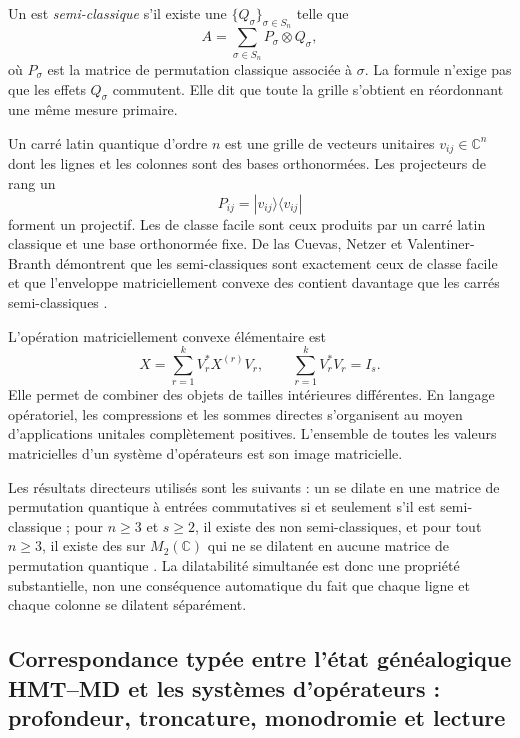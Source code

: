 Un \QMS est \emph{semi-classique} s'il existe une \POVM
\(\{Q_\sigma\}_{\sigma\in S_n}\) telle que
\[
 A=\sum_{\sigma\in S_n}P_\sigma\otimes Q_\sigma,
 \tag{GMC-1.2}
\]
où $P_\sigma$ est la matrice de permutation classique associée à
$\sigma$. La formule n'exige pas que les effets $Q_\sigma$ commutent. Elle dit
que toute la grille s'obtient en réordonnant une même mesure primaire.

Un carré latin quantique d'ordre $n$ est une grille de vecteurs
unitaires $v_{ij}\in\mathbb C^n$ dont les lignes et les colonnes sont des bases
orthonormées. Les projecteurs de rang un
\[
 P_{ij}=|v_{ij}\rangle\langle v_{ij}|
\]
forment un \QMS projectif. Les \QLS de classe facile sont ceux produits par un carré
latin classique et une base orthonormée fixe. De las Cuevas, Netzer et
Valentiner-Branth démontrent que les \QLS semi-classiques sont exactement ceux de
classe facile et que l'enveloppe matriciellement convexe des \QLS contient davantage que les
carrés semi-classiques \citep{delascuevas2023latin}.

L'opération matriciellement convexe élémentaire est
\[
 X=\sum_{r=1}^{k}V_r^*X^{(r)}V_r,
 \qquad
 \sum_{r=1}^{k}V_r^*V_r=I_s.
 \tag{GMC-1.3}
\]
Elle permet de combiner des objets de tailles intérieures différentes. En langage
opératoriel, les compressions et les sommes directes s'organisent au moyen
d'applications unitales complètement positives. L'ensemble de toutes les
valeurs matricielles d'un système d'opérateurs est son image matricielle.

\begin{importbox}
Les résultats directeurs utilisés sont les suivants : un \QMS se dilate en une matrice de
permutation quantique à entrées commutatives si et seulement s'il est semi-classique ;
pour $n\ge3$ et $s\ge2$, il existe des \QMS non semi-classiques, et pour tout $n\ge3$, il existe
des \QMS sur $M_2(\mathbb C)$ qui ne se dilatent en aucune matrice de
permutation quantique \citep{delascuevas2020qms}. La dilatabilité simultanée
est donc une propriété substantielle, non une conséquence automatique du
fait que chaque ligne et chaque colonne se dilatent séparément.
\end{importbox}

\subsection{Correspondance typée entre l'état généalogique HMT–MD et les systèmes d'opérateurs : profondeur, troncature, monodromie et lecture}

